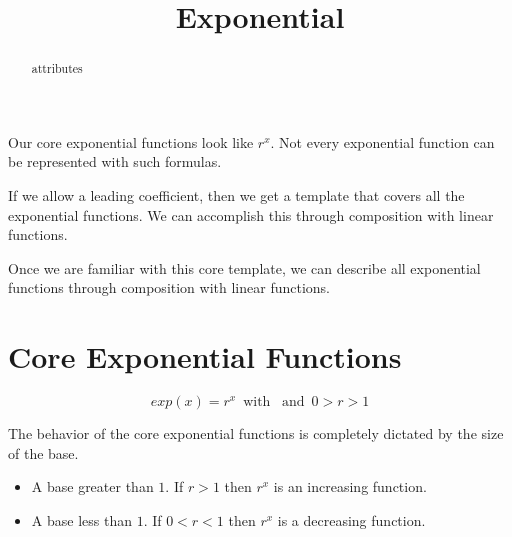 \documentclass{ximera}
\title{Exponential}
\begin{document}
\begin{abstract}
attributes
\end{abstract}
\maketitle


Our core exponential functions look like $r^x$. Not every exponential function can be represented with such formulas.

If we allow a leading coefficient, then we get a template that covers all the exponential functions. We can accomplish this through composition with linear functions.

Once we are familiar with this core template, we can describe all exponential functions through composition with linear functions.




\section*{Core Exponential Functions}


\[
exp(x) =  r^x \, \text{ with } \,  \text{ and } \, 0 > r > 1
\]


The behavior of the core exponential functions is completely dictated by the size of the base.


\begin{itemize}
\item A base greater than $1$. If $r>1$ then $r^x$ is an increasing function.
\item A base less than $1$. If $0<r<1$ then $r^x$ is a decreasing function.
\end{itemize}
\end{document}
